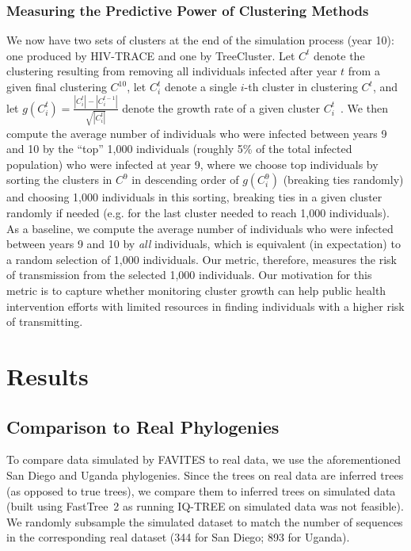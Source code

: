 \subsubsection{Measuring the Predictive Power of Clustering Methods}
We now have two sets of clusters at the end of the simulation process (year 10): one produced by HIV-TRACE and one by TreeCluster. Let $C^t$ denote the clustering resulting from removing all individuals infected after year $t$ from a given final clustering $C^{10}$, let $C^t_i$ denote a single $i$-th cluster in clustering $C^t$, and let $g(C^t_i) = \frac{\left\lvert C^t_i \right\rvert - \left\lvert C^{t-1}_i \right\rvert}{\sqrt{\left\lvert C^t_i \right\rvert}}$ denote the growth rate of a given cluster $C^t_i$~\cite{Wertheim2018}. We then compute the average number of individuals who were infected between years 9 and 10 by the ``top'' 1,000 individuals (roughly 5\% of the total infected population) who were infected at year 9, where we choose top individuals by sorting the clusters in $C^9$ in descending order of $g(C^9_i)$ (breaking ties randomly) and choosing 1,000 individuals in this sorting, breaking ties in a given cluster randomly if needed (e.g. for the last cluster needed to reach 1,000 individuals). As a baseline, we compute the average number of individuals who were infected between years 9 and 10 by \textit{all} individuals, which is equivalent (in expectation) to a random selection of 1,000 individuals. Our metric, therefore, measures the risk of transmission from the selected 1,000 individuals. Our motivation for this metric is to capture whether monitoring cluster growth can help public health intervention efforts with limited resources in finding individuals with a higher risk of transmitting.

\section{Results}
\subsection{Comparison to Real Phylogenies} To compare data simulated by FAVITES to real data, we use the aforementioned San Diego and Uganda phylogenies. Since the trees on real data are inferred trees (as opposed to true trees), we compare them to inferred trees on simulated data (built using FastTree~2 as running IQ-TREE on simulated data was not feasible). We randomly subsample the simulated dataset to match the number of sequences in the corresponding real dataset (344 for San Diego; 893 for Uganda).

